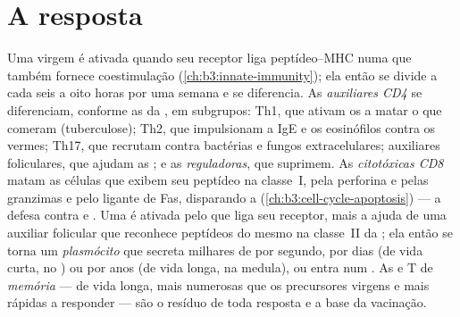 \section{A resposta}

\begin{definition}\label{def:b3:adaptive-immunity:response}
Uma  virgem é ativada quando seu receptor liga peptídeo--MHC numa
 que também fornece coestimulação (\cref{ch:b3:innate-immunity});
ela então se divide a cada seis a oito horas por uma semana e se
diferencia. As  \emph{auxiliares CD4} se diferenciam, conforme
as  da , em subgrupos: Th1, que ativam os
 a matar o que comeram (tuberculose); Th2, que impulsionam a
IgE e os eosinófilos contra os vermes; Th17, que recrutam 
contra bactérias e fungos extracelulares; auxiliares foliculares, que
ajudam as ; e as  \emph{reguladoras}, que suprimem. As
 \emph{citotóxicas CD8} matam as células que exibem seu
peptídeo na classe~I, pela perforina e pelas granzimas e pelo ligante de
Fas, disparando a  (\cref{ch:b3:cell-cycle-apoptosis}) --- a
defesa contra  e . Uma  é ativada pelo  que
liga seu receptor, mais a ajuda de uma  auxiliar folicular que
reconhece peptídeos do mesmo  na classe~II da ; ela
então se torna um \emph{plasmócito} que secreta milhares de 
por segundo, por dias (de vida curta, no ) ou por anos (de vida
longa, na medula), ou entra num . As  e T de
\emph{memória} --- de vida longa, mais numerosas que os precursores
virgens e mais rápidas a responder --- são o resíduo de toda resposta e
a base da vacinação.
\end{definition}

